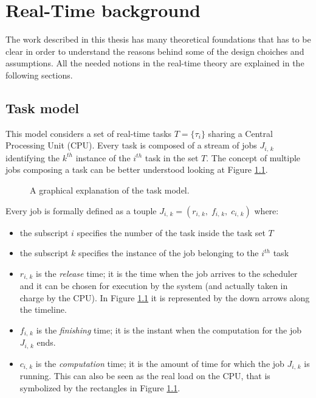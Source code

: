 \chapter{Real-Time background} \label{cha:rt_background}

The work described in this thesis has many theoretical foundations that has to be
clear in order to understand the reasons behind some of the design choiches and
assumptions. All the needed notions in the real-time theory are explained in the
following sections.


\section{Task model} \label{sec:task_model}
This model considers a set of real-time tasks \( T = \{\tau_{i}\} \)
sharing a Central Processing Unit (CPU). Every task
is composed of a stream of jobs \( J_{i,\,k} \) identifying the \( k^{th} \)
instance of the \( i^{th} \) task in the set \( T \). The concept of multiple
jobs composing a task can be better understood looking at Figure \ref{img:task_model}.
\begin{figure}[!htb]
    \caption{A graphical explanation of the task model.}
    \label{img:task_model}
\end{figure}

Every job is formally defined as a touple
\( J_{i,\,k} = \left(r_{i,\,k}, \;f_{i,\,k}, \;c_{i,\,k}\right) \) where:
\begin{itemize}
    \item the subscript \( i \) specifies the number of the task inside the task 
        set \( T \)
    \item the subscript \( k \) specifies the instance of the job belonging to
        the \( i^{th} \) task
    \item \( r_{i,\,k} \) is the \emph{release} time; it is the time when
        the job arrives to the scheduler and it can be chosen for execution
        by the system (and actually taken in charge by the CPU). In Figure
        \ref{img:task_model} it is represented by the down arrows along the
        timeline.
    \item \( f_{i,\,k} \) is the \emph{finishing} time; it is the instant when
        the computation for the job \( J_{i,\,k} \) ends.
    \item \( c_{i,\,k} \) is the \emph{computation} time; it is the amount of
        time for which the job \( J_{i,\,k} \) is running. This can also be seen
        as the real load on the CPU, that is symbolized by the rectangles
        in Figure \ref{img:task_model}.
\end{itemize} 

